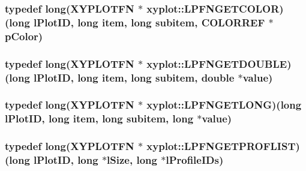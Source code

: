 \hypertarget{namespacexyplot_a0f7f51503a885f8e1b24c25973b1fc1d}{
\subsubsection[{L\-P\-F\-N\-G\-E\-T\-C\-O\-L\-O\-R}]{\setlength{\rightskip}{0pt plus 5cm}typedef {\bf long}({\bf X\-Y\-P\-L\-O\-T\-F\-N} $\ast$ xyplot\-::\-L\-P\-F\-N\-G\-E\-T\-C\-O\-L\-O\-R)({\bf long} l\-Plot\-I\-D, {\bf long} item, {\bf long} subitem, C\-O\-L\-O\-R\-R\-E\-F $\ast$p\-Color)}}\label{namespacexyplot_a0f7f51503a885f8e1b24c25973b1fc1d}
\hypertarget{namespacexyplot_ada339f0f5dd59a8edbeb5462b404b412}{
\subsubsection[{L\-P\-F\-N\-G\-E\-T\-D\-O\-U\-B\-L\-E}]{\setlength{\rightskip}{0pt plus 5cm}typedef {\bf long}({\bf X\-Y\-P\-L\-O\-T\-F\-N} $\ast$ xyplot\-::\-L\-P\-F\-N\-G\-E\-T\-D\-O\-U\-B\-L\-E)({\bf long} l\-Plot\-I\-D, {\bf long} item, {\bf long} subitem, double $\ast$value)}}\label{namespacexyplot_ada339f0f5dd59a8edbeb5462b404b412}
\hypertarget{namespacexyplot_a7fdb8fd61356e30fc76cd5a02266dbf7}{
\subsubsection[{L\-P\-F\-N\-G\-E\-T\-L\-O\-N\-G}]{\setlength{\rightskip}{0pt plus 5cm}typedef {\bf long}({\bf X\-Y\-P\-L\-O\-T\-F\-N} $\ast$ xyplot\-::\-L\-P\-F\-N\-G\-E\-T\-L\-O\-N\-G)({\bf long} l\-Plot\-I\-D, {\bf long} item, {\bf long} subitem, {\bf long} $\ast$value)}}\label{namespacexyplot_a7fdb8fd61356e30fc76cd5a02266dbf7}
\hypertarget{namespacexyplot_a6dfacb1414fefdad54092cb9264eb4b1}{
\subsubsection[{L\-P\-F\-N\-G\-E\-T\-P\-R\-O\-F\-L\-I\-S\-T}]{\setlength{\rightskip}{0pt plus 5cm}typedef {\bf long}({\bf X\-Y\-P\-L\-O\-T\-F\-N} $\ast$ xyplot\-::\-L\-P\-F\-N\-G\-E\-T\-P\-R\-O\-F\-L\-I\-S\-T)({\bf long} l\-Plot\-I\-D, {\bf long} $\ast$l\-Size, {\bf long} $\ast$l\-Profile\-I\-Ds)}}\label{namespacexyplot_a6dfacb1414fefdad54092cb9264eb4b1}
